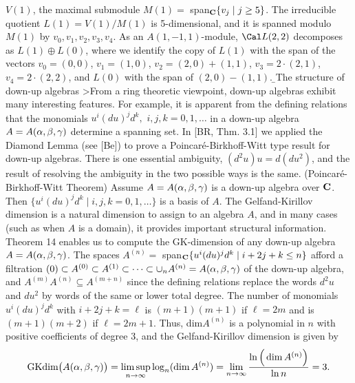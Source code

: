       $V(1)$, the maximal submodule $M(1) =$ span$_{\text {\bf C}}\{v_j \mid j \geq 5\}$.
      The irreducible quotient $L(1) = V(1)/M(1)$ is 5-dimensional, and it is
      spanned modulo $M(1)$ by $v_0,v_1,v_2,v_3, v_4$.  As an
      $A(1,-1,1)$-module, $\Cal L(2,2)$ decomposes as $L(1) \oplus L(0)$,
      where we identify the copy of $L(1)$ with the span of the vectors
      $v_0 = (0,0)$, $v_1 =
      (1,0)$, $v_2 = (2,0) + (1,1)$,
      $v_3 = 2 \cdot (2,1)$, $v_4 = 2 \cdot (2,2)$, and $L(0)$ with
      the span of $(2,0) - (1,1)$.  
      \b
      \subhead  The structure of down-up algebras \endsubhead  
      \m
      >From a ring theoretic viewpoint, down-up algebras exhibit many interesting
      features. For example, it is apparent from the
      defining relations that
      the monomials $u^i(du)^jd^k,$ $i,j,k = 0,1, \dots$ in
      a down-up algebra $A = A(\alpha,\beta,\gamma)$   
      determine a spanning set.  
      In [BR, Thm. 3.1] we applied the Diamond Lemma (see [Be]) to prove a 
      Poincar\'e-Birkhoff-Witt type result for down-up algebras.  There
      is one essential ambiguity,  $(d^2u)u  = d(du^2)$,  and the result of
      resolving the ambiguity in the two possible ways is the same.  
      \m
       (Poincar\'e-Birkhoff-Witt Theorem) Assume $A =
      A(\alpha,\beta,\gamma)$ is a down-up algebra over ${\text {\bf C}}$. Then
      $\{u^i(du)^jd^k \mid i,j,k = 0,1,\dots \}$ is a basis of $A$.
      \endproclaim
      \m
      The Gelfand-Kirillov dimension is a natural dimension to assign to an algebra $A$,
      and in many cases (such as when $A$ is  a domain), 
      it provides important structural information. 
      Theorem 14 enables us to compute the GK-dimension of any down-up algebra $A =
      A(\alpha,\beta,\gamma)$.   The spaces  $A^{(n)} =$ span$_{\text {\bf C}}\{u^i (du)^j d^k \mid
      i+2j+k \leq n\}$ afford a filtration
      $(0) \subset A^{(0)} \subset A^{(1)} \subset \dots \subset \cup_n A^{(n)} =
      A(\alpha,\beta,\gamma)$ of the down-up algebra, and $A^{(m)} A^{(n)} \subseteq A^{(m+n)}$ since the
      defining relations replace the words $d^2 u$ and $d u^2$ by words of the
      same or lower total degree.  The number of monomials $u^i (du)^j d^k$
      with $i+2j+k = \ell$ is $(m+1)(m+1)$ if $\ell = 2m$ and is $(m+1)(m+2)$
      if $\ell = 2m+1$.    Thus, dim$A^{(n)}$ is a polynomial in $n$ with
      positive coefficients of degree 3, and 
      the Gelfand-Kirillov dimension is given by
      $$ 
      \text{GKdim}\big(A(\alpha,\beta,\gamma)\big) = \limsup_{n \rightarrow \infty} \log_n(\dim
      A^{(n)})
       = \lim_{n \rightarrow \infty}{\frac {\ln\Big(\dim
      A^{(n)}\Big)}{\ln n}} = 3.$$
